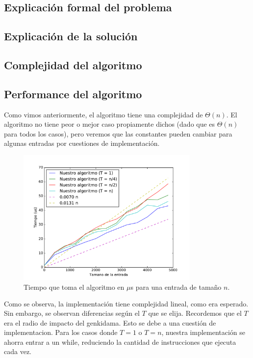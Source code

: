 \subsection{Explicación formal del problema}

\subsection{Explicación de la solución}

\subsection{Complejidad del algoritmo}

\subsection{Performance del algoritmo}

Como vimos anteriormente, el algoritmo tiene una complejidad de $\Theta(n)$. El algoritmo no tiene peor o mejor caso propiamente dichos (dado que es $\Theta(n)$ para todos los casos), pero veremos que las constantes pueden cambiar para algunas entradas por cuestiones de implementación.

\begin{figure}[H]
 \centering
	\includegraphics[width=0.8\textwidth]{img/tiempos/genkidama1.pdf}
	\caption{\footnotesize Tiempo que toma el algoritmo en $\mu$s para una entrada de tamaño $n$.}
	\label{fig:genkidama-tiempos1}
\end{figure}

Como se observa, la implementación tiene complejidad lineal, como era esperado. Sin embargo, se observan diferencias según el $T$ que se elija. Recordemos que el $T$ era el radio de impacto del genkidama. Esto se debe a una cuestión de implementacion. Para los casos donde $T = 1$ o $T = n$, nuestra implementación se ahorra entrar a un while, reduciendo la cantidad de instrucciones que ejecuta cada vez.

